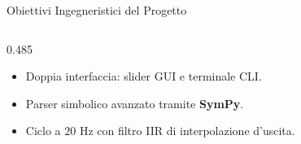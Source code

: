 \documentclass[aspectratio=169, 10pt]{beamer}
\begin{document}
\begin{frame}{Obiettivi Ingegneristici del Progetto}
\begin{columns}[onlytextwidth, T]
\begin{column}{0.485\textwidth}
            \begin{tcolorbox}[moderncard, title={\color{UniPgNavy}Architettura Software ROS}, equal height group=obj_bot]
                \footnotesize
                \begin{itemize}
                    \setlength{\itemsep}{1.5pt}
                    \item Doppia interfaccia: slider GUI e terminale CLI.
                    \item Parser simbolico avanzato tramite \textbf{SymPy}.
                    \item Ciclo a $20\text{ Hz}$ con filtro IIR di interpolazione d'uscita.
                \end{itemize}
            \end{tcolorbox}
        \end{column}
    \end{columns}
\end{frame}
\end{document}
